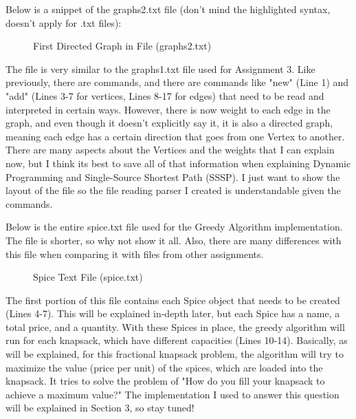 \documentclass[letterpaper, 10pt]{article}
\begin{document}
\vspace{1em}
\noindent
Below is a snippet of the graphs2.txt file (don't mind the highlighted syntax, doesn't apply for .txt files):
\begin{figure}[H]
  \centering
   
  \caption{First Directed Graph in File (graphs2.txt)}
  \label{fig:figure1.2}
\end{figure}

\noindent
The file is very similar to the graphs1.txt file used for Assignment 3. Like previously, there are commands, and there are commands like "new" (Line 1) and "add" (Lines 3-7 for vertices, Lines 8-17 for edges) that need to be read and interpreted in certain ways. However, there is now weight to each edge in the graph, and even though it doesn't explicitly say it, it is also a directed graph, meaning each edge has a certain direction that goes from one Vertex to another. There are many aspects about the Vertices and the weights that I can explain now, but I think its best to save all of that information when explaining Dynamic Programming and Single-Source Shortest Path (SSSP). I just want to show the layout of the file so the file reading parser I created is understandable given the commands.

\vspace{1em}
\noindent
Below is the entire spice.txt file used for the Greedy Algorithm implementation. The file is shorter, so why not show it all. Also, there are many differences with this file when comparing it with files from other assignments.

\begin{figure}[H]
  \centering
   
  \caption{Spice Text File (spice.txt)}
  \label{fig:figure1.3}
\end{figure}

\noindent
The first portion of this file contains each Spice object that needs to be created (Lines 4-7). This will be explained in-depth later, but each Spice has a name, a total price, and a quantity. With these Spices in place, the greedy algorithm will run for each knapsack, which have different capacities (Lines 10-14). Basically, as will be explained, for this fractional knapsack problem, the algorithm will try to maximize the value (price per unit) of the spices, which are loaded into the knapsack. It tries to solve the problem of "How do you fill your knapsack to achieve a maximum value?" The implementation I used to answer this question will be explained in Section 3, so stay tuned!
\end{document}
